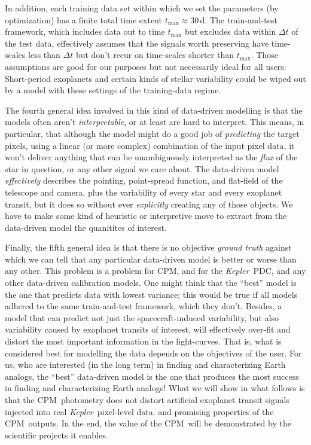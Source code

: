 \documentclass[12pt, preprint]{aastex}
\newcommand{\project}[1]{\textsl{#1}}
\newcommand{\Kepler}{\project{Kepler}}
\newcommand{\name}{CPM}
\begin{document}
In addition, each training data set within which we set the parameters (by optimization) has a finite total time extent $t_{\max}\approx 30$\,d.
The train-and-test framework, which includes data out to time $t_{\max}$ but excludes data within $\Delta t$ of the test data,
  effectively assumes that the signals worth preserving have time-scales less than $\Delta t$ but don't recur on time-scales
  shorter than $t_{\max}$.
Those assumptions are good for our purposes but not necessarily ideal for all users:
Short-period exoplanets and certain kinds of stellar variability
  could be wiped out by a model with these settings of the training-data regime.

The fourth general idea involved in this kind of data-driven modelling is that the models often aren't \emph{interpretable}, or at least are hard to interpret.
This means, in particular, that although the model might do a good job of \emph{predicting} the target pixels,
  using a linear (or more complex) combination of the input pixel data,
  it won't deliver anything that can be unambiguously interpreted as the \emph{flux} of the star in question,
  or any other signal we care about.
The data-driven model \emph{effectively} describes the pointing, point-spread function, and flat-field
  of the telescope and camera,
  plus the variability of every star and every exoplanet transit,
  but it does so without ever \emph{explicitly} creating any of those objects.
We have to make some kind of heuristic or interpretive move to extract from the data-driven model the quanitites of interest.

Finally, the fifth general idea is that there is no objective \emph{ground truth} against which we can tell
  that any particular data-driven model is better or worse than any other.
This problem is a problem for \name, and for the \Kepler\ PDC, and any other data-driven calibration models.
One might think that the ``best'' model is the one that predicts data with lowest variance;
  this would be true if all models adhered to the same train-and-test framework, which they don't.
Besides, a model that can predict not just the spacecraft-induced variability,
  but also variability caused by exoplanet transits of interest,
  will effectively over-fit and distort the most important information in the light-curves.
That is, what is considered best for modelling the data depends on the objectives of the user.
For us, who are interested (in the long term) in finding and characterizing Earth analogs,
  the ``best'' data-driven model is the one that produces the most success in finding and characterizing Earth analogs!
What we will show in what follows is that the \name\ photometry does not distort
  artificial exoplanet transit signals injected into real \Kepler\ pixel-level data.
  and promising properties of the \name\ outputs.
In the end, the value of the \name\ will be demonstrated by the scientific projects it enables.
\end{document}
